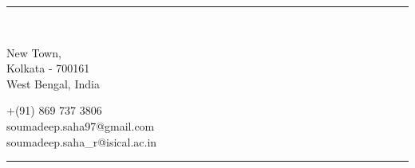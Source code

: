\documentclass[10pt]{article}
\title{\vspace{-4em}\graytext{\bfseries\huge Soumadeep Saha}\vspace{-2em}}
\date{}
\begin{document}
\maketitle
	\noindent\rule{\textwidth}{0.4pt}\\

	\begin{minipage}[ht]{0.70\textwidth}
		New Town,\\
		Kolkata - 700161\\
		West Bengal, India\\
	\end{minipage}
	\begin{minipage}[ht]{0.48\textwidth}
		+(91) 869 737 3806\\
		soumadeep.saha97@gmail.com\\
		soumadeep.saha\_r@isical.ac.in\\
	\end{minipage}

	\noindent\rule{\textwidth}{0.4pt}

\end{document}
